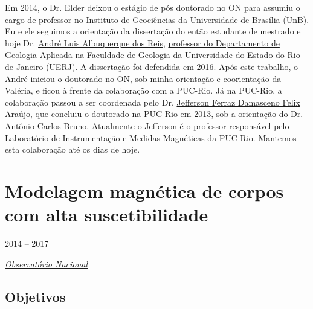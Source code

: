 Em 2014, o Dr. Elder deixou o estágio de pós doutorado no ON para assumiu o cargo de
professor no 
\href{http://www.pesquisar.unb.br/professor/elder-yokoyama}{Instituto de Geociências da Universidade de Brasília (UnB)}. 
Eu e ele seguimos a orientação da dissertação do então estudante de mestrado e hoje
Dr. \href{https://lattes.cnpq.br/1075610796165589}{André Luis Albuquerque dos Reis},
\href{https://www.fgel.uerj.br/site/departamentos/depto-de-geologia-aplicada/dgap-quadro-de-pessoal/}{professor do Departamento de Geologia Aplicada} 
na Faculdade de Geologia da Universidade do
Estado do Rio de Janeiro (UERJ). A dissertação foi defendida em 2016.
Após este trabalho, o André iniciou o doutorado no ON, sob minha orientação e
coorientação da Valéria, e ficou à frente da colaboração com a PUC-Rio. 
Já na PUC-Rio, a colaboração passou a ser coordenada pelo Dr. \href{https://lattes.cnpq.br/0190128964748843}{Jefferson Ferraz Damasceno
Felix Araújo}, que concluiu o doutorado na PUC-Rio em 2013, sob a orientação do 
Dr. Antônio Carlos Bruno. Atualmente o Jefferson é o professor responsável pelo 
\href{https://www.fis.puc-rio.br/instrumentacao-e-medidas-magneticas/}{Laboratório de Instrumentação e Medidas Magnéticas da PUC-Rio}.
Mantemos esta colaboração até os dias de hoje.

\clearpage

\section{Modelagem magnética de corpos com alta suscetibilidade} 
\label{sec:projeto-Diego}

 2014 -- 2017
\vspace{0.3\baselineskip}\\
\noindent\parbox{0.03\textwidth}{\vspace{-0.2\baselineskip}\faUniversity} \href{https://www.gov.br/observatorio/pt-br}{\textsl{Observatório Nacional}}
\parbox{0.03\textwidth}{\vspace{-0.2\baselineskip} \hfill {}}

\subsection*{Objetivos}

